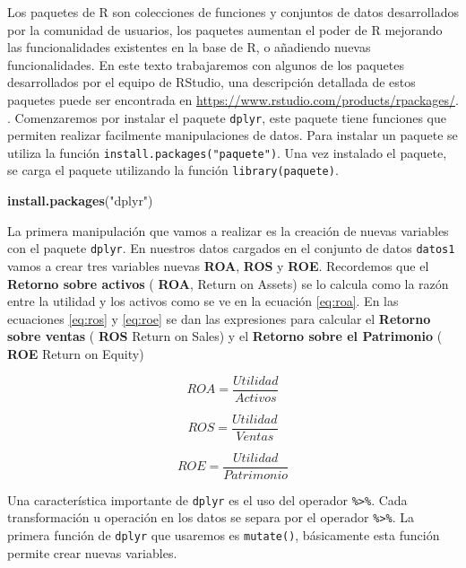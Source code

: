 \documentclass[]{book}
\newenvironment{Shaded}{\begin{snugshade}}{\end{snugshade}}
\newcommand{\KeywordTok}[1]{\textcolor[rgb]{0.13,0.29,0.53}{\textbf{#1}}}
\newcommand{\StringTok}[1]{\textcolor[rgb]{0.31,0.60,0.02}{#1}}
\newcommand{\NormalTok}[1]{#1}
\begin{document}
Los paquetes de R son colecciones de funciones y conjuntos de datos
desarrollados por la comunidad de usuarios, los paquetes aumentan el
poder de R mejorando las funcionalidades existentes en la base de R, o
añadiendo nuevas funcionalidades. En este texto trabajaremos con algunos
de los paquetes desarrollados por el equipo de RStudio, una descripción
detallada de estos paquetes puede ser encontrada en
\url{https://www.rstudio.com/products/rpackages/}. . Comenzaremos por
instalar el paquete \texttt{dplyr}, este paquete tiene funciones que
permiten realizar facilmente manipulaciones de datos. Para instalar un
paquete se utiliza la función \texttt{install.packages("paquete")}. Una
vez instalado el paquete, se carga el paquete utilizando la función
\texttt{library(paquete)}.

\begin{Shaded}
\begin{Highlighting}[]
\KeywordTok{install.packages}\NormalTok{(}\StringTok{"dplyr"}\NormalTok{)}
\end{Highlighting}
\end{Shaded}

La primera manipulación que vamos a realizar es la creación de nuevas
variables con el paquete \texttt{dplyr}. En nuestros datos cargados en
el conjunto de datos \texttt{datos1} vamos a crear tres variables nuevas
\textbf{ROA}, \textbf{ROS} y \textbf{ROE}. Recordemos que el
\textbf{Retorno sobre activos} ( \textbf{ROA}, Return on Assets) se lo
calcula como la razón entre la utilidad y los activos como se ve en la
ecuación \eqref{eq:roa}. En las ecuaciones \eqref{eq:ros} y \eqref{eq:roe} se
dan las expresiones para calcular el \textbf{Retorno sobre ventas} (
\textbf{ROS} Return on Sales) y el \textbf{Retorno sobre el Patrimonio}
( \textbf{ROE} Return on Equity)

\begin{equation} 
  ROA = \dfrac{Utilidad}{Activos}
  \label{eq:roa}
\end{equation}

\begin{equation} 
  ROS = \dfrac{Utilidad}{Ventas}
  \label{eq:ros}
\end{equation}

\begin{equation} 
  ROE = \dfrac{Utilidad}{Patrimonio}
  \label{eq:roe}
\end{equation}

Una característica importante de \texttt{dplyr} es el uso del operador
\texttt{\%\textgreater{}\%}. Cada transformación u operación en los
datos se separa por el operador \texttt{\%\textgreater{}\%}. La primera
función de \texttt{dplyr} que usaremos es \texttt{mutate()}, básicamente
esta función permite crear nuevas variables.
\end{document}
